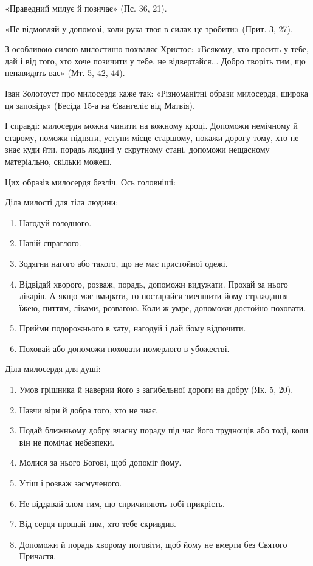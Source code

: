 \documentclass[main.tex]{subfiles}
\begin{document}
«Праведний милує й позичає» (Пс. 36, 21).

«Пе відмовляй у допомозі, коли рука твоя в силах це зробити» (Прит. З, 27).

З особливою силою милостиню похваляє Христос: «Всякому, хто просить у тебе, дай і від того, хто хоче позичити у тебе, не відвертайся... Добро творіть тим, що ненавидять вас» (Мт. 5, 42, 44).

Іван Золотоуст про милосердя каже так: «Різноманітні образи милосердя, широка ця заповідь» (Бесіда 15-а на Євангеліє від Матвія).

І справді: милосердя можна чинити на кожному кроці. Допоможи немічному й старому, поможи підняти, уступи місце старшому, покажи дорогу тому, хто не знає куди йти, порадь людині у скрутному стані, допоможи нещасному матеріально, скільки можеш.

Цих образів милосердя безліч. Ось головніші:

Діла милості для тіла людини:

\begin{enumerate}
    \item Нагодуй голодного.
    \item Напій спраглого.
    \item Зодягни нагого або такого, що не має пристойної одежі.
    \item Відвідай хворого, розваж, порадь, допоможи видужати. Прохай за нього лікарів. А якщо має вмирати, то постарайся зменшити йому страждання їжею, питтям, ліками, розвагою. Коли ж умре, допоможи достойно поховати.
    \item Прийми подорожнього в хату, нагодуй і дай йому відпочити.
    \item Поховай або допоможи поховати померлого в убожестві.
\end{enumerate}

Діла милосердя для душі:
\begin{enumerate}
    \item Умов грішника й наверни його з загибельної дороги на добру (Як. 5, 20).
    \item Навчи віри й добра того, хто не знає.
    \item Подай ближньому добру вчасну пораду під час його труднощів або тоді, коли він не помічає небезпеки.
    \item Молися за нього Богові, щоб допоміг йому.
    \item Утіш і розваж засмученого.
    \item Не віддавай злом тим, що спричиняють тобі прикрість.
    \item Від серця прощай тим, хто тебе скривдив.
    \item Допоможи й порадь хворому поговіти, щоб йому не вмерти без Святого Причастя.
\end{enumerate}
\end{document}
